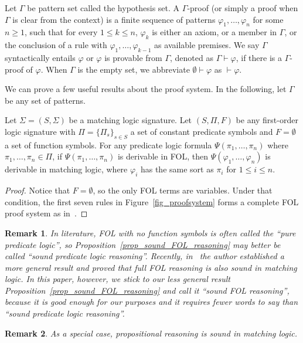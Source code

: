 \documentclass[acmsmall]{acmart}
\theoremstyle{acmdefinition}
\newtheorem{remark}{Remark}
\newcommand{\sig}{\mathbb{\Sigma}}
\newcommand{\ddd}{,\dots,}
\begin{document}
\begin{definition}
\label{def_proof}
Let $\Gamma$ be pattern set called the hypothesis set.
A $\Gamma$-proof (or simply a proof when $\Gamma$ is clear from the context)
is a finite sequence of patterns
$\varphi_1 \ddd \varphi_n$ for some $n \ge 1$, such that
for every $1 \le k \le n$,
$\varphi_k$ is either an axiom,
or a member in $\Gamma$,
or the conclusion of a rule
with $\varphi_1 \ddd \varphi_{k-1}$ as available premises.
We say $\Gamma$ syntactically entails $\varphi$ or 
$\varphi$ is provable from $\Gamma$,
denoted as $\Gamma \vdash \varphi$,
if there is a $\Gamma$-proof of $\varphi$.
When $\Gamma$ is the empty set,
we abbreviate $\emptyset \vdash \varphi$
as $\vdash \varphi$.
\end{definition}

We can prove a few useful results about the proof system.
In the following, let $\Gamma$ be any set of patterns.

\begin{proposition}
\label{prop_sound_FOL_reasoning}
Let $\sig = (S, \Sigma)$ be a matching logic signature.
Let $(S,\Pi,F)$ be any first-order logic signature
with $\Pi = \{ \Pi_s \}_{s \in S}$ a set of constant predicate symbols
and $F = \emptyset$ a set of function symbols.
For any predicate logic formula
$\Psi(\pi_1 \ddd \pi_n)$ where
$\pi_1 \ddd \pi_n \in \Pi$,
if $\Psi(\pi_1 \ddd \pi_n)$ is derivable in FOL,
then $\Psi(\varphi_1 \ddd \varphi_n)$ is derivable in matching logic,
where $\varphi_i$ has the same sort as $\pi_i$ for $1 \le i \le n$.
\end{proposition}
\begin{proof}
Notice that $F = \emptyset$, so the only FOL terms are variables.
Under that condition, the first seven rules in Figure~\ref{fig_proofsystem}
forms a complete FOL proof system as in~\cite{hamilton1988logic}.
\end{proof}

\begin{remark}
In literature, FOL with no function symbols is often called 
the ``pure predicate logic'',
so Proposition~\ref{prop_sound_FOL_reasoning} may better be called
``sound predicate logic reasoning''.
Recently, in~\cite{rosu-2017-lmcs} the author established a more general result
and proved that full FOL reasoning is also sound in matching logic.
In this paper, however, we stick to
our less general result Proposition~\ref{prop_sound_FOL_reasoning}
and call it ``sound FOL reasoning'', 
because it is good enough for our purposes
and it requires fewer words to say
than ``sound predicate logic reasoning''.
\end{remark}
\begin{remark}
As a special case, propositional reasoning is sound in matching logic.
\end{remark}
\end{document}

